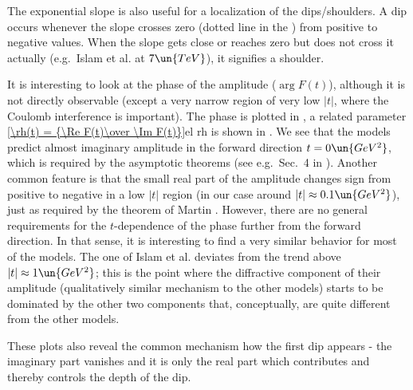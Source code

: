 The exponential slope is also useful for a localization of the dips/shoulders. A dip occurs whenever the slope crosses zero (dotted line in the ) from positive to negative values. When the slope gets close or reaches zero but does not cross it actually (e.g.~Islam et al. at $7\un{TeV}$), it signifies a shoulder.


It is interesting to look at the phase of the amplitude ($\arg F(t)$), although it is not directly observable (except a very narrow region of very low $|t|$, where the Coulomb interference is important). The phase is plotted in , a related parameter 
\eqref{\rh(t) = {\Re F(t)\over \Im F(t)}}{el rh}
is shown in . We see that the models predict almost imaginary amplitude in the forward direction $t=0\un{GeV^2}$, which is required by the asymptotic theorems (see e.g.~Sec.~4 in ). Another common feature is that the small real part of the amplitude changes sign from positive to negative in a low $|t|$ region (in our case around $|t| \approx 0.1\un{GeV^2}$), just as required by the theorem of Martin . However, there are no general requirements for the $t$-dependence of the phase further from the forward direction. In that sense, it is interesting to find a very similar behavior for most of the models. The one of Islam et al. deviates from the trend above $|t|\approx 1\un{GeV^2}$; this is the point where the diffractive component of their amplitude (qualitatively similar mechanism to the other models) starts to be dominated by the other two components that, conceptually, are quite different from the other models.


These plots also reveal the common mechanism how the first dip appears - the imaginary part vanishes and it is only the real part which contributes and thereby controls the depth of the dip.



